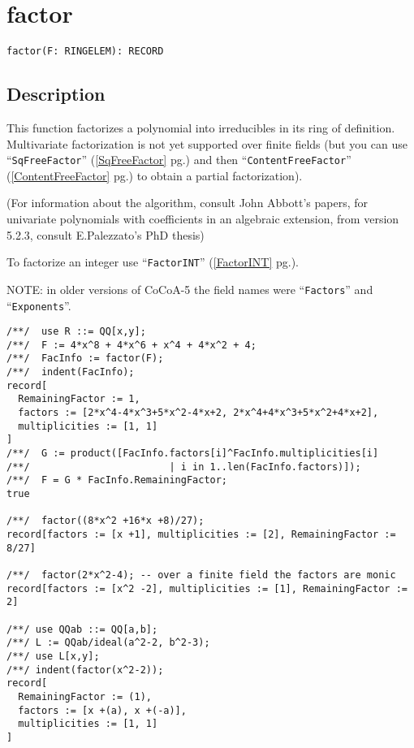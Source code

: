 \documentclass[a4paper]{mybook}
\newenvironment{command}{}{} %
\begin{document}
\section{factor}
\label{factor}
\begin{command} %


\begin{Verbatim}[label=syntax, rulecolor=\color{MidnightBlue},
frame=single]
factor(F: RINGELEM): RECORD
\end{Verbatim}


\subsection*{Description}

This function factorizes a polynomial into irreducibles in its ring of
definition.  Multivariate factorization is not yet supported over finite
fields (but you can use ``\verb&SqFreeFactor&'' (\ref{SqFreeFactor} pg.\pageref{SqFreeFactor}) and then ``\verb&ContentFreeFactor&'' (\ref{ContentFreeFactor} pg.\pageref{ContentFreeFactor})
to obtain a partial factorization).
\par 
(For information about the algorithm, consult John Abbott's papers,
for univariate polynomials with coefficients in an algebraic extension,
from version 5.2.3, consult E.Palezzato's PhD thesis)
\par 
To factorize an integer use ``\verb&FactorINT&'' (\ref{FactorINT} pg.\pageref{FactorINT}).
\par 
NOTE: in older versions of CoCoA-5 the field names were ``\verb&Factors&''
and ``\verb&Exponents&''.
\begin{Verbatim}[label=example, rulecolor=\color{PineGreen}, frame=single]
/**/  use R ::= QQ[x,y];
/**/  F := 4*x^8 + 4*x^6 + x^4 + 4*x^2 + 4;
/**/  FacInfo := factor(F);
/**/  indent(FacInfo);
record[
  RemainingFactor := 1,
  factors := [2*x^4-4*x^3+5*x^2-4*x+2, 2*x^4+4*x^3+5*x^2+4*x+2],
  multiplicities := [1, 1]
]
/**/  G := product([FacInfo.factors[i]^FacInfo.multiplicities[i]
/**/                        | i in 1..len(FacInfo.factors)]);
/**/  F = G * FacInfo.RemainingFactor;
true

/**/  factor((8*x^2 +16*x +8)/27);
record[factors := [x +1], multiplicities := [2], RemainingFactor := 8/27]

/**/  factor(2*x^2-4); -- over a finite field the factors are monic
record[factors := [x^2 -2], multiplicities := [1], RemainingFactor := 2]

/**/ use QQab ::= QQ[a,b];
/**/ L := QQab/ideal(a^2-2, b^2-3);
/**/ use L[x,y];
/**/ indent(factor(x^2-2));
record[
  RemainingFactor := (1),
  factors := [x +(a), x +(-a)],
  multiplicities := [1, 1]
]


\end{Verbatim}
\end{command}
\end{document}
